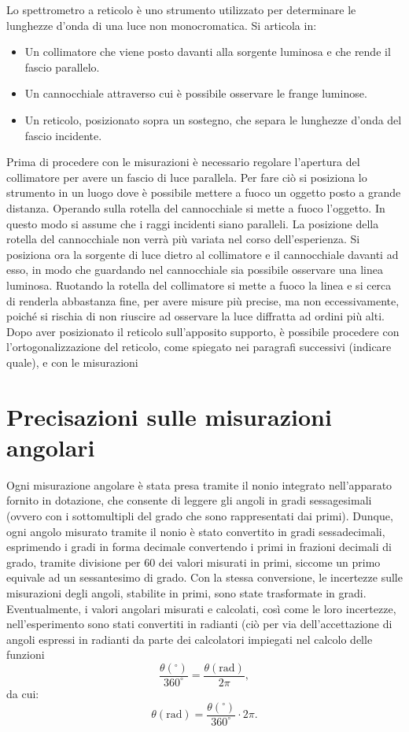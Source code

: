 \documentclass[a4paper,12pt]{article}
\begin{document}
Lo spettrometro a reticolo è uno strumento utilizzato per determinare le lunghezze d’onda di una luce non monocromatica. Si articola in: 
\begin{itemize}
    \item Un collimatore che viene posto davanti alla sorgente luminosa e che rende il fascio parallelo. 
    \item  Un cannocchiale attraverso cui è possibile osservare le frange luminose. 
    \item  Un reticolo, posizionato sopra un sostegno, che separa le lunghezze d’onda del fascio incidente. 
\end{itemize}
Prima di procedere con le misurazioni è necessario regolare l’apertura del collimatore per avere un fascio di luce parallela. Per fare ciò si posiziona lo strumento in un luogo dove è possibile mettere a fuoco un oggetto posto a grande distanza. Operando sulla rotella del cannocchiale si mette a fuoco l’oggetto. In questo modo si assume che i raggi incidenti siano paralleli. La posizione della rotella del cannocchiale non verrà più variata nel corso dell’esperienza.  
Si posiziona ora la sorgente di luce dietro al collimatore e il cannocchiale davanti ad esso, in modo che guardando nel cannocchiale sia possibile osservare una linea luminosa. Ruotando la rotella del collimatore si mette a fuoco la linea e si cerca di renderla abbastanza fine, per avere misure più precise, ma non eccessivamente, poiché si rischia di non riuscire ad osservare la luce diffratta ad ordini più alti.  
Dopo aver posizionato il reticolo sull’apposito supporto, è possibile procedere con l’ortogonalizzazione del reticolo, come spiegato nei paragrafi successivi (indicare quale), e con le misurazioni 

\section{Precisazioni sulle misurazioni angolari}
Ogni misurazione angolare è stata presa tramite il nonio integrato nell’apparato fornito in dotazione, che consente di leggere gli angoli in gradi sessagesimali (ovvero con i sottomultipli del grado che sono rappresentati dai primi). Dunque, ogni angolo misurato tramite il nonio è stato convertito in gradi sessadecimali, esprimendo i gradi in forma decimale convertendo i primi in frazioni decimali di grado, tramite divisione per 60 dei valori misurati in primi, siccome un primo equivale ad un sessantesimo di grado. Con la stessa conversione, le incertezze sulle misurazioni degli angoli, stabilite in primi, sono state trasformate in gradi. Eventualmente, i valori angolari misurati e calcolati, così come le loro incertezze, nell’esperimento sono stati convertiti in radianti (ciò per via dell’accettazione di angoli espressi in radianti da parte dei calcolatori impiegati nel calcolo delle funzioni
\[
\frac{\theta (^\circ)}{360^\circ} = \frac{\theta (\text{rad})}{2\pi},
\]
da cui:
\[
\theta (\text{rad}) = \frac{\theta (^\circ)}{360^\circ} \cdot 2\pi.
\]
\end{document}
